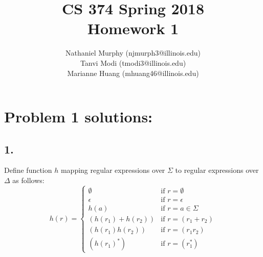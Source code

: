 \documentclass[11pt]{article}
\title{\textbf{CS 374 Spring 2018 \\
				Homework 1}}
\author{Nathaniel Murphy (njmurph3@illinois.edu) \\
		Tanvi Modi (tmodi3@illinois.edu) \\
		Marianne Huang (mhuang46@illinois.edu)}
\date{}
\begin{document}
\maketitle

\section*{Problem 1 solutions:}
\subsection*{1.}
Define function $h$ mapping regular expressions over $\Sigma$ to regular expressions over $\Delta$ as follows:
\[h(r)=
	\begin{cases}
	\emptyset & \text{if } r=\emptyset \\
	\epsilon & \text{if } r=\epsilon \\
	h(a) & \text{if } r=a\in\Sigma \\
	(h(r_1)+h(r_2)) & \text{if } r=(r_1+r_2) \\
	(h(r_1)h(r_2)) & \text{if } r=(r_1r_2) \\
	(h(r_1)^*) & \text{if } r=(r_1^*)
	\end{cases}
\]
\end{document}
